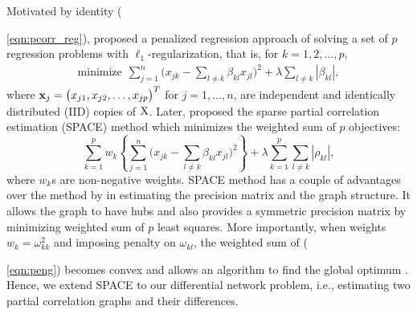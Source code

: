 \documentclass[useAMS,usenatbib,referee]{bio}
\begin{document}
Motivated by identity ({\ref{eqn:pcorr_reg}), \citet{Meinshausen:2006} proposed a penalized regression approach of solving a set of $p$ regression problems with $\ell_1$-regularization, that is, for $k=1,2,\ldots,p$,
\begin{eqnarray*} \label{eqn:regress_mb}
\mbox{minimize} ~~ \sum_{j=1}^n \big( x_{jk} - \sum_{l\neq k}
\beta_{kl} x_{jl}\big)^2  + \lambda \sum_{l \neq k} |\beta_{kl}|,
\end{eqnarray*}
where ${\bf x}_j=\big(x_{j1},x_{j2},\ldots,x_{jp}\big)^T$ for $j=1,\ldots,n$, are independent and identically distributed (IID) copies of ${\rm X}$.
Later, \citet{Peng:2009} proposed the sparse partial correlation estimation (SPACE) method which minimizes the weighted sum of $p$ objectives:
\begin{equation} \label{eqn:peng}
\sum_{k=1}^p w_k \left\{ \sum_{j=1}^n \big( x_{jk} - \sum_{l\neq k}
\beta_{kl}
     x_{jl}\big)^2 \right\} + \lambda \sum_{k=1}^p\sum_{l \neq k} |\rho_{kl}|,
\end{equation}
where $w_k$s are non-negative weights. 
SPACE method has a couple of advantages over the method by \citet{Meinshausen:2006} in estimating the precision matrix and the graph structure. It allows the graph to have hubs and also provides a symmetric precision matrix by minimizing weighted sum of $p$ least squares. 
More importantly, when weights $w_k= \omega^2_{kk}$ and imposing penalty on $\omega_{kl}$, the weighted sum of ({\ref{eqn:peng}) becomes convex and allows an algorithm to find the global optimum \citep{Khare2014}. 
Hence, we extend SPACE to our differential network problem, i.e., estimating two partial correlation graphs and their differences.

}}
\end{document}
